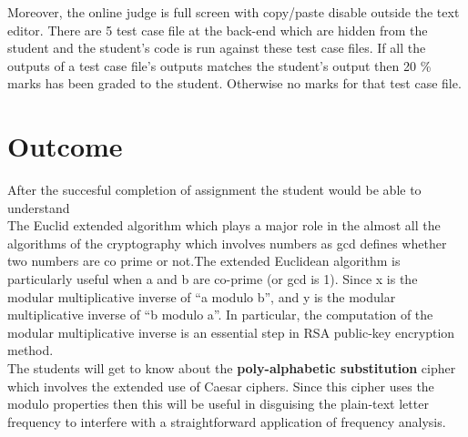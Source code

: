 \documentclass{article}
\begin{document}
Moreover, the online judge is full screen with copy/paste disable outside the text editor. There are 5 test case file at the back-end which are hidden from the student and the student's code is run against these test case files. If all the outputs of a test case file's outputs matches the student's output then 20 \% marks has been graded to the student. Otherwise no marks for that test case file. 
		
\section{Outcome}
After the succesful completion of assignment the student would be able to understand \\ The Euclid extended algorithm which plays a major role in the almost all the algorithms of the cryptography which involves numbers as gcd defines whether two numbers are co prime or not.The extended Euclidean algorithm is particularly useful when a and b are co-prime (or gcd is 1). Since x is the modular multiplicative inverse of “a modulo b”, and y is the modular multiplicative inverse of “b modulo a”. In particular, the computation of the modular multiplicative inverse is an essential step in RSA public-key encryption method.\\

The students will get to know about the \textbf{poly-alphabetic substitution} cipher which involves the extended use of Caesar ciphers. Since this cipher uses the modulo properties then this will be useful in disguising the plain-text letter frequency to interfere with a straightforward application of frequency analysis. 
\end{document}
